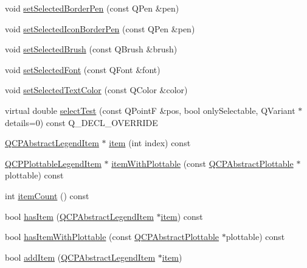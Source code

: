 \begin{DoxyCompactItemize}
\item 
void \hyperlink{class_q_c_p_legend_a2c35d262953a25d96b6112653fbefc88}{set\+Selected\+Border\+Pen} (const Q\+Pen \&pen)
\item 
void \hyperlink{class_q_c_p_legend_ade93aabe9bcccaf9cf46cec22c658027}{set\+Selected\+Icon\+Border\+Pen} (const Q\+Pen \&pen)
\item 
void \hyperlink{class_q_c_p_legend_a875227f3219c9799464631dec5e8f1bd}{set\+Selected\+Brush} (const Q\+Brush \&brush)
\item 
void \hyperlink{class_q_c_p_legend_ab580a01c3c0a239374ed66c29edf5ad2}{set\+Selected\+Font} (const Q\+Font \&font)
\item 
void \hyperlink{class_q_c_p_legend_a7674dfc7a1f30e1abd1018c0ed45e0bc}{set\+Selected\+Text\+Color} (const Q\+Color \&color)
\item 
virtual double \hyperlink{class_q_c_p_legend_aa53507624491908fb3d1a514b1fc674e}{select\+Test} (const Q\+PointF \&pos, bool only\+Selectable, Q\+Variant $\ast$details=0) const Q\+\_\+\+D\+E\+C\+L\+\_\+\+O\+V\+E\+R\+R\+I\+DE
\item 
\hyperlink{class_q_c_p_abstract_legend_item}{Q\+C\+P\+Abstract\+Legend\+Item} $\ast$ \hyperlink{class_q_c_p_legend_acfe9694c45104a3359d3806ed366fcf7}{item} (int index) const
\item 
\hyperlink{class_q_c_p_plottable_legend_item}{Q\+C\+P\+Plottable\+Legend\+Item} $\ast$ \hyperlink{class_q_c_p_legend_a91e790002d8bf15a20628a8e8841e397}{item\+With\+Plottable} (const \hyperlink{class_q_c_p_abstract_plottable}{Q\+C\+P\+Abstract\+Plottable} $\ast$plottable) const
\item 
int \hyperlink{class_q_c_p_legend_a57ab86ab8b2a3762d4c1455eb5452c88}{item\+Count} () const
\item 
bool \hyperlink{class_q_c_p_legend_ad0f698e33db454a6c103b5206740e599}{has\+Item} (\hyperlink{class_q_c_p_abstract_legend_item}{Q\+C\+P\+Abstract\+Legend\+Item} $\ast$\hyperlink{class_q_c_p_legend_acfe9694c45104a3359d3806ed366fcf7}{item}) const
\item 
bool \hyperlink{class_q_c_p_legend_a4b90a442af871582df85c2bc13f91e88}{has\+Item\+With\+Plottable} (const \hyperlink{class_q_c_p_abstract_plottable}{Q\+C\+P\+Abstract\+Plottable} $\ast$plottable) const
\item 
bool \hyperlink{class_q_c_p_legend_a3ab274de52d2951faea45a6d975e6b3f}{add\+Item} (\hyperlink{class_q_c_p_abstract_legend_item}{Q\+C\+P\+Abstract\+Legend\+Item} $\ast$\hyperlink{class_q_c_p_legend_acfe9694c45104a3359d3806ed366fcf7}{item})

\end{DoxyCompactItemize}

